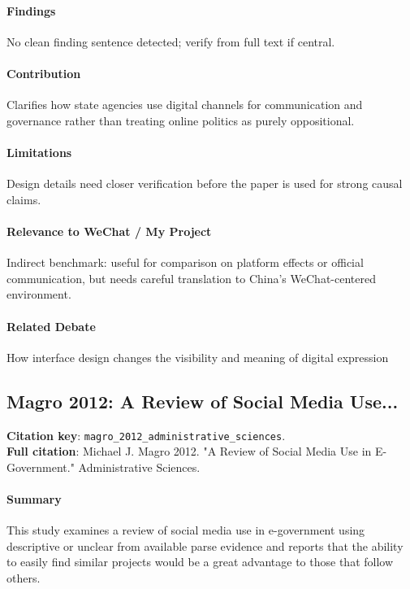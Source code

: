 \documentclass[12pt]{article}
\begin{document}
\paragraph{Findings} No clean finding sentence detected; verify from full text if central.

\paragraph{Contribution} Clarifies how state agencies use digital channels for communication and governance rather than treating online politics as purely oppositional.

\paragraph{Limitations} Design details need closer verification before the paper is used for strong causal claims.

\paragraph{Relevance to WeChat / My Project} Indirect benchmark: useful for comparison on platform effects or official communication, but needs careful translation to China's WeChat-centered environment.

\paragraph{Related Debate} How interface design changes the visibility and meaning of digital expression


\subsection{Magro 2012: A Review of Social Media Use...}
\textbf{Citation key}: \texttt{magro\_2012\_administrative\_sciences}.\\
\textbf{Full citation}: Michael J. Magro 2012. "A Review of Social Media Use in E-Government." Administrative Sciences.

\paragraph{Summary} This study examines a review of social media use in e-government using descriptive or unclear from available parse evidence and reports that the ability to easily find similar projects would be a great advantage to those that follow others.
\end{document}
